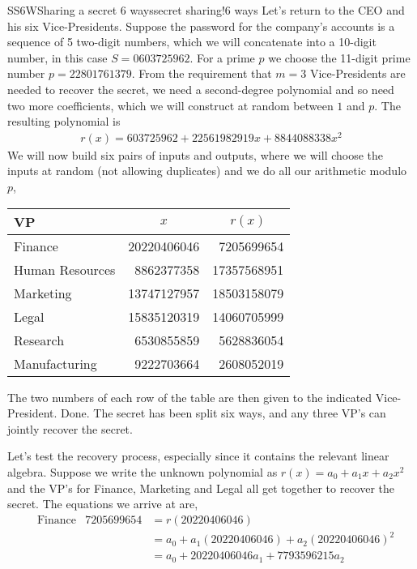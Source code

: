 \begin{example}{SS6W}{Sharing a secret 6 ways}{secret sharing!6 ways}
%
Let's return to the CEO and his six Vice-Presidents.  Suppose the password for the company's accounts is a sequence of 5 two-digit numbers, which we will concatenate into a 10-digit number, in this case $S= 0603725962$.  For a prime $p$ we choose the 11-digit prime number $p=22801761379$.  From the requirement that $m=3$ Vice-Presidents are needed to recover the secret, we need a second-degree polynomial and so need two more coefficients, which we will construct at random between $1$ and $p$.  The resulting polynomial is
%
\begin{align*}
r(x)=603725962 + 22561982919 x + 8844088338 x^2
\end{align*}
%
We will now build six pairs of inputs and outputs, where we will choose the inputs at random (not allowing duplicates) and we do all our arithmetic modulo $p$,
%
\begin{center}
\begin{tabular}{lrr}
VP&\multicolumn{1}{c}{$x$}&\multicolumn{1}{c}{$r(x)$}\\\hline
 Finance                  & 20220406046 & 7205699654 \\
 Human Resources   & 8862377358   & 17357568951 \\
 Marketing               & 13747127957 & 18503158079 \\
 Legal                      & 15835120319 & 14060705999 \\
 Research                & 6530855859   & 5628836054 \\
 Manufacturing         & 9222703664   & 2608052019
\end{tabular}
\end{center}
%
The two numbers of each row of the table are then given to the indicated Vice-President.  Done.  The secret has been split six ways, and any three VP's can jointly recover the secret.\par
%
Let's test the recovery process, especially since it contains the relevant linear algebra.  Suppose we write the unknown polynomial as $r(x)=a_0+a_1x +a_2x^2$ and the VP's for Finance, Marketing and Legal all get together to recover the secret.  The equations we arrive at are,
%
\begin{align*}
&\text{Finance}
&
7205699654
&=r(20220406046)\\
&&&= a_0 + a_1(20220406046) + a_2(20220406046)^2\\
&&&= a_0 + 20220406046 a_1 + 7793596215 a_2\\

\end{align*}
\end{example}
